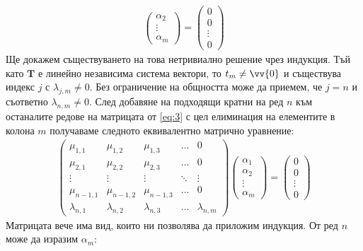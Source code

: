 \documentclass[a4paper,12pt,fleqn]{article}
\begin{document}
{\begin{gather}
\begin{pmatrix}
          \alpha_{2} \\
          \vdots \\
          \alpha_{m}
        \end{pmatrix}
        =
        \begin{pmatrix}
          0 \\
          0 \\
          \vdots \\
          0
        \end{pmatrix}
      \end{gather}
      Ще докажем съществуването на това нетривиално решение чрез индукция. Тъй като \( \textbf{T} \) е линейно независима система вектори, то \( t_{m} \neq \vv{0} \) и съществува индекс \( j \) с \( \lambda_{j,m} \neq 0 \). Без ограничение на общността може да приемем, че \( j = n \) и съответно \( \lambda_{n, m} \neq 0 \).
      След добавяне на подходящи кратни на ред \( n \) към останалите редове на матрицата от \eqref{eq:3} с цел елиминация на елементите в колона \( m \) получаваме следното еквивалентно матрично уравнение:
      \begin{gather}\label{eq:4}
        \begin{pmatrix}
          \mu_{1, 1} & \mu_{1, 2} & \mu_{1, 3} & \dots & 0 \\
          \mu_{2, 1} & \mu_{2, 2} & \mu_{2, 3} & \dots & 0 \\
          \vdots & \vdots & \vdots & \ddots & \vdots \\
          \mu_{n-1, 1} & \mu_{n-1, 2} & \mu_{n-1, 3} & \dots & 0 \\
          \lambda_{n, 1} & \lambda_{n, 2} & \lambda_{n, 3} & \dots & \lambda_{n, m} 
        \end{pmatrix}
        \begin{pmatrix}
          \alpha_{1} \\
          \alpha_{2} \\
          \vdots \\
          \alpha_{m}
        \end{pmatrix}
        =
        \begin{pmatrix}
          0 \\
          0 \\
          \vdots \\
          0
        \end{pmatrix}
      \end{gather}
      Матрицата вече има вид, които ни позволява да приложим индукция. От ред \( n \) може да изразим \( \alpha_{m} \):
}
\end{document}
